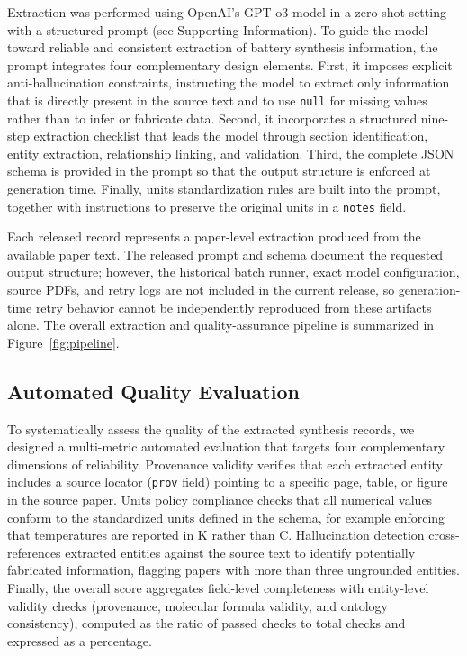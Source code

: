 \documentclass[12pt,a4paper]{article}
\begin{document}
Extraction was performed using OpenAI's GPT-o3 model in a zero-shot setting with a structured prompt (see Supporting Information). To guide the model toward reliable and consistent extraction of battery synthesis information, the prompt integrates four complementary design elements. First, it imposes explicit anti-hallucination constraints, instructing the model to extract only information that is directly present in the source text and to use \texttt{null} for missing values rather than to infer or fabricate data. Second, it incorporates a structured nine-step extraction checklist that leads the model through section identification, entity extraction, relationship linking, and validation. Third, the complete JSON schema is provided in the prompt so that the output structure is enforced at generation time. Finally, units standardization rules are built into the prompt, together with instructions to preserve the original units in a \texttt{notes} field.

Each released record represents a paper-level extraction produced from the available paper text. The released prompt and schema document the requested output structure; however, the historical batch runner, exact model configuration, source PDFs, and retry logs are not included in the current release, so generation-time retry behavior cannot be independently reproduced from these artifacts alone. The overall extraction and quality-assurance pipeline is summarized in Figure~\ref{fig:pipeline}.

\subsection{Automated Quality Evaluation}
\label{sec:evaluation}

To systematically assess the quality of the extracted synthesis records, we designed a multi-metric automated evaluation that targets four complementary dimensions of reliability. Provenance validity verifies that each extracted entity includes a source locator (\texttt{prov} field) pointing to a specific page, table, or figure in the source paper. Units policy compliance checks that all numerical values conform to the standardized units defined in the schema, for example enforcing that temperatures are reported in K rather than \textdegree C. Hallucination detection cross-references extracted entities against the source text to identify potentially fabricated information, flagging papers with more than three ungrounded entities. Finally, the overall score aggregates field-level completeness with entity-level validity checks (provenance, molecular formula validity, and ontology consistency), computed as the ratio of passed checks to total checks and expressed as a percentage.
\end{document}
